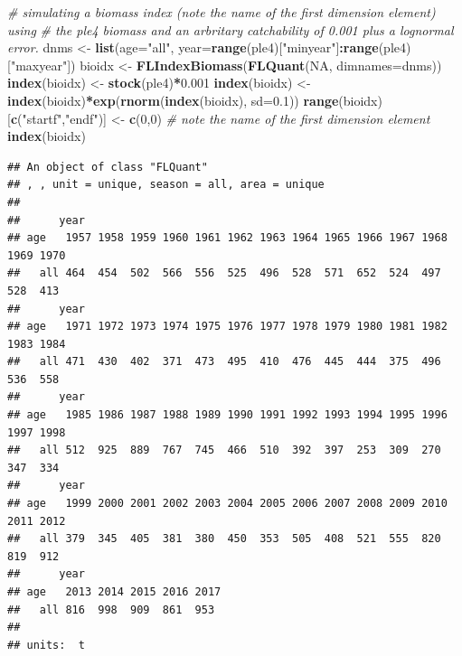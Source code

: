 \documentclass[
]{book}
\newenvironment{Shaded}{\begin{snugshade}}{\end{snugshade}}
\newcommand{\AttributeTok}[1]{\textcolor[rgb]{0.13,0.29,0.53}{#1}}
\newcommand{\CommentTok}[1]{\textcolor[rgb]{0.56,0.35,0.01}{\textit{#1}}}
\newcommand{\ConstantTok}[1]{\textcolor[rgb]{0.56,0.35,0.01}{#1}}
\newcommand{\DecValTok}[1]{\textcolor[rgb]{0.00,0.00,0.81}{#1}}
\newcommand{\FloatTok}[1]{\textcolor[rgb]{0.00,0.00,0.81}{#1}}
\newcommand{\FunctionTok}[1]{\textcolor[rgb]{0.13,0.29,0.53}{\textbf{#1}}}
\newcommand{\NormalTok}[1]{#1}
\newcommand{\OtherTok}[1]{\textcolor[rgb]{0.56,0.35,0.01}{#1}}
\newcommand{\SpecialCharTok}[1]{\textcolor[rgb]{0.81,0.36,0.00}{\textbf{#1}}}
\newcommand{\StringTok}[1]{\textcolor[rgb]{0.31,0.60,0.02}{#1}}
\begin{document}
\begin{Shaded}
\begin{Highlighting}[]
\CommentTok{\# simulating a biomass index (note the name of the first dimension element) using }
\CommentTok{\# the ple4 biomass and an arbritary catchability of 0.001 plus a lognormal error.}
\NormalTok{dnms }\OtherTok{\textless{}{-}} \FunctionTok{list}\NormalTok{(}\AttributeTok{age=}\StringTok{"all"}\NormalTok{, }\AttributeTok{year=}\FunctionTok{range}\NormalTok{(ple4)[}\StringTok{"minyear"}\NormalTok{]}\SpecialCharTok{:}\FunctionTok{range}\NormalTok{(ple4)[}\StringTok{"maxyear"}\NormalTok{])}
\NormalTok{bioidx }\OtherTok{\textless{}{-}} \FunctionTok{FLIndexBiomass}\NormalTok{(}\FunctionTok{FLQuant}\NormalTok{(}\ConstantTok{NA}\NormalTok{, }\AttributeTok{dimnames=}\NormalTok{dnms))}
\FunctionTok{index}\NormalTok{(bioidx) }\OtherTok{\textless{}{-}} \FunctionTok{stock}\NormalTok{(ple4)}\SpecialCharTok{*}\FloatTok{0.001}
\FunctionTok{index}\NormalTok{(bioidx) }\OtherTok{\textless{}{-}} \FunctionTok{index}\NormalTok{(bioidx)}\SpecialCharTok{*}\FunctionTok{exp}\NormalTok{(}\FunctionTok{rnorm}\NormalTok{(}\FunctionTok{index}\NormalTok{(bioidx), }\AttributeTok{sd=}\FloatTok{0.1}\NormalTok{))}
\FunctionTok{range}\NormalTok{(bioidx)[}\FunctionTok{c}\NormalTok{(}\StringTok{"startf"}\NormalTok{,}\StringTok{"endf"}\NormalTok{)] }\OtherTok{\textless{}{-}} \FunctionTok{c}\NormalTok{(}\DecValTok{0}\NormalTok{,}\DecValTok{0}\NormalTok{)}
\CommentTok{\# note the name of the first dimension element}
\FunctionTok{index}\NormalTok{(bioidx)}
\end{Highlighting}
\end{Shaded}

\begin{verbatim}
## An object of class "FLQuant"
## , , unit = unique, season = all, area = unique
## 
##      year
## age   1957 1958 1959 1960 1961 1962 1963 1964 1965 1966 1967 1968 1969 1970
##   all 464  454  502  566  556  525  496  528  571  652  524  497  528  413 
##      year
## age   1971 1972 1973 1974 1975 1976 1977 1978 1979 1980 1981 1982 1983 1984
##   all 471  430  402  371  473  495  410  476  445  444  375  496  536  558 
##      year
## age   1985 1986 1987 1988 1989 1990 1991 1992 1993 1994 1995 1996 1997 1998
##   all 512  925  889  767  745  466  510  392  397  253  309  270  347  334 
##      year
## age   1999 2000 2001 2002 2003 2004 2005 2006 2007 2008 2009 2010 2011 2012
##   all 379  345  405  381  380  450  353  505  408  521  555  820  819  912 
##      year
## age   2013 2014 2015 2016 2017
##   all 816  998  909  861  953 
## 
## units:  t
\end{verbatim}
\end{document}
